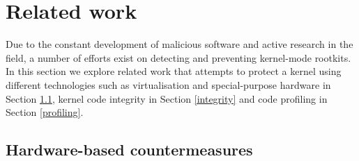\clearpage

\section{Related work}\label{hr:related}
Due to the constant development of malicious software and active research in the field, a number of efforts exist on detecting and preventing kernel-mode rootkits. 
In this section we explore related work that attempts to protect a kernel using different technologies such as virtualisation and special-purpose hardware in Section \ref{hardware}, kernel code integrity in Section \ref{integrity} and code profiling in Section \ref{profiling}.


\subsection{Hardware-based countermeasures} \label{hardware}
